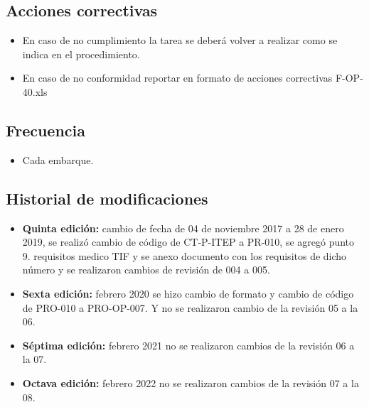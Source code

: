 \subsection{Acciones correctivas}

\begin{itemize}
	\item En caso de no cumplimiento la tarea se deberá volver a realizar como se indica en el procedimiento.
	\item En caso de no conformidad reportar en formato de acciones correctivas F-OP-40.xls
\end{itemize}

\subsection{Frecuencia}

\begin{itemize}
	\item Cada embarque.
\end{itemize}

\subsection{Historial de modificaciones} %

\begin{itemize}
	\item \textbf{Quinta edición:} cambio de fecha de 04 de noviembre 2017 a 28 de enero 2019, se realizó cambio de código de CT-P-ITEP a PR-010, se agregó punto 9. requisitos medico TIF y se anexo documento con los requisitos de dicho número y se realizaron cambios de revisión de 004 a 005.
	\item \textbf{Sexta edición:} febrero 2020 se hizo cambio de formato y cambio de código de PRO-010 a PRO-OP-007. Y no se realizaron cambio de la revisión 05 a la 06.
	\item \textbf{Séptima edición:} febrero 2021 no se realizaron cambios de la revisión 06 a la 07.
	\item \textbf{Octava edición:} febrero 2022 no se realizaron cambios de la revisión 07 a la 08.
\end{itemize}
